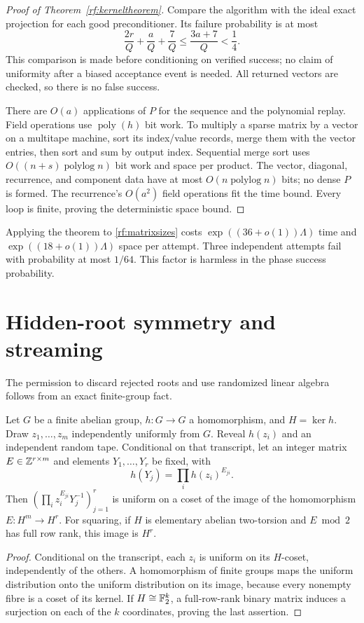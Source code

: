 \begin{proof}[Proof of Theorem~\ref{rf:kerneltheorem}]
Compare the algorithm with the ideal exact projection for each
good preconditioner.  Its failure probability is at most
\[
 \frac{2r}{Q}+\frac aQ+\frac7Q
 \le\frac{3a+7}{Q}<\frac14.
\]
This comparison is made before conditioning on verified success;
no claim of uniformity after a biased acceptance event is needed.
All returned vectors are checked, so there is no false success.

There are $O(a)$ applications of $P$ for the sequence and the
polynomial replay.  Field operations use
$\operatorname{poly}(h)$ bit work.  To multiply a sparse matrix
by a vector on a multitape machine, sort its index/value records,
merge them with the vector entries, then sort and sum by output
index.  Sequential merge sort uses
$O((n+s)\operatorname{polylog}n)$ bit work and space per product.
The vector, diagonal, recurrence, and component data have at
most $O(n\operatorname{polylog}n)$ bits; no dense $P$ is formed.
The recurrence's $O(a^2)$ field operations fit the time bound.
Every loop is finite, proving the deterministic space bound.
\end{proof}

Applying the theorem to \eqref{rf:matrixsizes} costs
$\exp((36+o(1))\Lambda)$ time and
$\exp((18+o(1))\Lambda)$ space per attempt.
Three independent attempts fail with probability at most $1/64$.
This factor is harmless in the phase success probability.

\section{Hidden-root symmetry and streaming}
\label{rf:blindness}

The permission to discard rejected roots and use randomized
linear algebra follows from an exact finite-group fact.

\begin{theorem}
\label{rf:blindtheorem}
Let $G$ be a finite abelian group, $h:G\to G$ a homomorphism,
and $H=\ker h$.  Draw $z_1,\ldots,z_m$ independently uniformly
from $G$.  Reveal $h(z_i)$ and an independent random tape.
Conditional on that transcript, let an integer matrix
$E\in\mathbb Z^{r\times m}$ and elements $Y_1,\ldots,Y_r$ be fixed,
with
\[
 h(Y_j)=\prod_i h(z_i)^{E_{ji}}.
\]
Then $(\prod_i z_i^{E_{ji}}Y_j^{-1})_{j=1}^r$ is uniform on a
coset of the image of the homomorphism $E:H^m\to H^r$.
For squaring, if $H$ is elementary abelian two-torsion and
$E\bmod2$ has full row rank, this image is $H^r$.
\end{theorem}
\begin{proof}
Conditional on the transcript, each $z_i$ is uniform on its
$H$-coset, independently of the others.  A homomorphism of finite
groups maps the uniform distribution onto the uniform distribution
on its image, because every nonempty fibre is a coset of its
kernel.  If $H\cong\mathbb F_2^k$, a full-row-rank binary matrix induces
a surjection on each of the $k$ coordinates, proving the last
assertion.
\end{proof}

